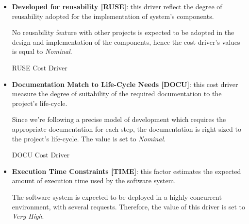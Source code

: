 \begin{itemize}
\begin{costdriverstable}{CPLX Cost Driver}
\end{costdriverstable}


	\item \textbf{Developed for reusability [RUSE]}: this driver reflect the degree of reusability adopted for the implementation of system's components.

No reusability feature with other projects is expected to be adopted in the design and implementation of the components, hence the cost driver's values is equal to \textit{Nominal}.

\begin{costdriverstable}{RUSE Cost Driver}
	\hline
\end{costdriverstable}

	\item \textbf{Documentation Match to Life-Cycle Needs [DOCU]}: this cost driver measure the degree of suitability of the required documentation to the project's life-cycle.

Since we're following a precise model of development which requires the appropriate documentation for each step, the documentation is right-sized to the project's life-cycle. The value is set to \textit{Nominal}.

	\begin{costdriverstable}{DOCU Cost Driver}
		\hline
	\end{costdriverstable}

	\item \textbf{Execution Time Constraints [TIME]}: this factor estimates the expected amount of execution time used by the software system.

The software system is expected to be deployed in a highly concurrent environment, with several requests. Therefore, the value of this driver is set to \textit{Very High}.


\end{itemize}
